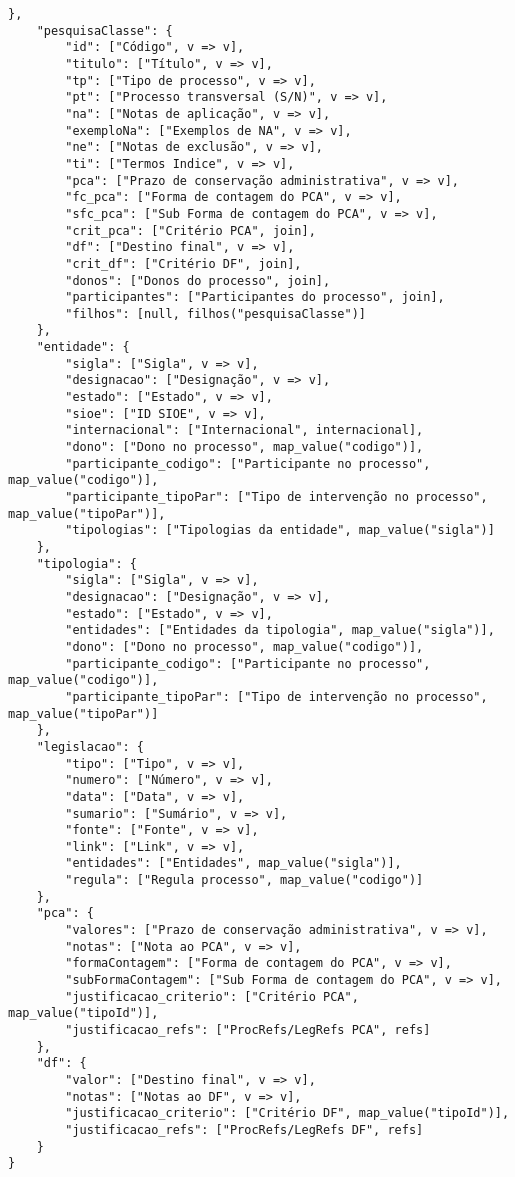 \begin{lstlisting}[language=pseudocode, caption=Algoritmo de conversão de \acrshort{json} para \acrshort{csv}]
    },
    "pesquisaClasse": {
        "id": ["Código", v => v],
        "titulo": ["Título", v => v],
        "tp": ["Tipo de processo", v => v],
        "pt": ["Processo transversal (S/N)", v => v],
        "na": ["Notas de aplicação", v => v],
        "exemploNa": ["Exemplos de NA", v => v],
        "ne": ["Notas de exclusão", v => v],
        "ti": ["Termos Indice", v => v],
        "pca": ["Prazo de conservação administrativa", v => v],
        "fc_pca": ["Forma de contagem do PCA", v => v],
        "sfc_pca": ["Sub Forma de contagem do PCA", v => v],
        "crit_pca": ["Critério PCA", join],
        "df": ["Destino final", v => v],
        "crit_df": ["Critério DF", join],
        "donos": ["Donos do processo", join],
        "participantes": ["Participantes do processo", join],
        "filhos": [null, filhos("pesquisaClasse")]
    },
    "entidade": {
        "sigla": ["Sigla", v => v],
        "designacao": ["Designação", v => v],
        "estado": ["Estado", v => v],
        "sioe": ["ID SIOE", v => v],
        "internacional": ["Internacional", internacional],
        "dono": ["Dono no processo", map_value("codigo")],
        "participante_codigo": ["Participante no processo", map_value("codigo")],
        "participante_tipoPar": ["Tipo de intervenção no processo", map_value("tipoPar")],
        "tipologias": ["Tipologias da entidade", map_value("sigla")]
    },
    "tipologia": {
        "sigla": ["Sigla", v => v],
        "designacao": ["Designação", v => v],
        "estado": ["Estado", v => v],
        "entidades": ["Entidades da tipologia", map_value("sigla")],
        "dono": ["Dono no processo", map_value("codigo")],
        "participante_codigo": ["Participante no processo", map_value("codigo")],
        "participante_tipoPar": ["Tipo de intervenção no processo", map_value("tipoPar")]
    },
    "legislacao": {
        "tipo": ["Tipo", v => v],
        "numero": ["Número", v => v],
        "data": ["Data", v => v],
        "sumario": ["Sumário", v => v],
        "fonte": ["Fonte", v => v],
        "link": ["Link", v => v],
        "entidades": ["Entidades", map_value("sigla")],
        "regula": ["Regula processo", map_value("codigo")]
    },
    "pca": {
        "valores": ["Prazo de conservação administrativa", v => v],
        "notas": ["Nota ao PCA", v => v],
        "formaContagem": ["Forma de contagem do PCA", v => v],
        "subFormaContagem": ["Sub Forma de contagem do PCA", v => v],
        "justificacao_criterio": ["Critério PCA", map_value("tipoId")],
        "justificacao_refs": ["ProcRefs/LegRefs PCA", refs]
    },
    "df": {
        "valor": ["Destino final", v => v],
        "notas": ["Notas ao DF", v => v],
        "justificacao_criterio": ["Critério DF", map_value("tipoId")],
        "justificacao_refs": ["ProcRefs/LegRefs DF", refs]
    }
}


\end{lstlisting}

